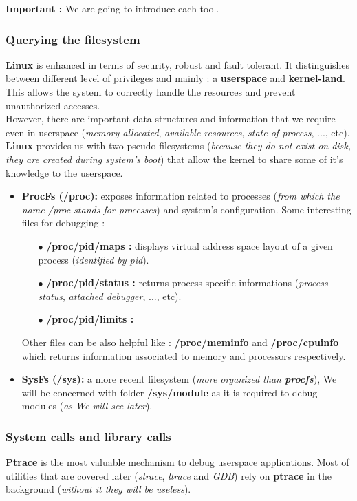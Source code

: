  
 
    
\textbf{\color{red}Important : } We are going to introduce each tool.
\subsubsection{Querying the filesystem}
\textbf{Linux} is enhanced in terms of security, robust and fault tolerant. It distinguishes between different level of privileges
and mainly : a \textbf{userspace} and \textbf{kernel-land}. This allows the system to correctly handle the resources and prevent unauthorized accesses.\\

However, there are important data-structures and information that we require even in userspace (\emph{memory allocated}, \emph{available resources}, \emph{state of process}, ..., etc). \textbf{Linux} provides us with two pseudo filesystems (\textit{because they do not exist on disk, they are created during system's boot}) that allow the kernel to share some of it's knowledge to the userspace.    

\begin{itemize}
	\item \textbf{ProcFs (/proc): } exposes information related to processes (\emph{from which the name /proc stands for processes}) and system's configuration. Some interesting files for debugging :
		\begin{itemize}
			\item[$\bullet$] \textbf{/proc/pid/maps : } displays virtual address space layout of a given process (\textit{identified by pid}).
			\item[$\bullet$] \textbf{/proc/pid/status : } returns process specific informations (\emph{process status}, \emph{{\color{red}attached debugger}}, ..., etc).
			\item[$\bullet$] \textbf{/proc/pid/limits : }						
		\end{itemize}
Other files can be also helpful like : \textbf{/proc/meminfo} and \textbf{/proc/cpuinfo} which returns information associated to memory and processors respectively.	
	\item \textbf{SysFs (/sys): } a more recent filesystem (\emph{more organized than \textbf{procfs}}), We will be concerned with folder \textbf{/sys/module} as it is required to debug modules (\textit{as We will see later}). 
	
	
\end{itemize}

\subsubsection{System calls and library calls}
\label{System calls and library calls}
\textbf{Ptrace} is the most valuable mechanism to debug userspace applications. Most of utilities that are covered later (\emph{strace}, \emph{ltrace} and \emph{GDB}) rely on \textbf{ptrace} in the background (\emph{without it they will be useless}).\\

